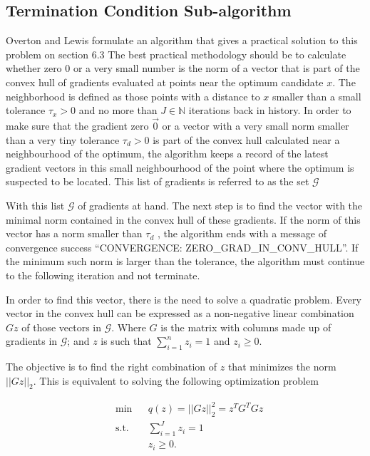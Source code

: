 \subsection{Termination Condition Sub-algorithm}
Overton and Lewis formulate an algorithm that gives a practical solution to this problem on section $6.3$ \citep{overtonlewis}
The best practical methodology should be to calculate whether zero $0$ or a very small number is the norm of a vector that is part of the convex hull of gradients evaluated at points near the optimum candidate $x$. The neighborhood is defined as those points with a distance to $x$ smaller than a small tolerance $\tau_x > 0$ and no more than $J \in \mathbb{N}$ iterations back in history. In order to make sure that the gradient zero $\vec{0}$ or a vector with a very small norm smaller than a very tiny tolerance $\tau_d > 0$ is part of the convex hull calculated near a neighbourhood of the optimum, the algorithm  keeps a record of the latest gradient vectors in this small neighbourhood of the point where the optimum is suspected to be located. This list of gradients is referred to as the set $\mathcal{G}$ \citep{overtonlewis}

With this list $\mathcal{G}$ of gradients at hand. The next step is to find the vector with the minimal norm contained in the convex hull of these gradients.  If the norm of this vector has a norm smaller than $\tau_d$ , the algorithm ends with a message of convergence success ``CONVERGENCE: ZERO\_GRAD\_IN\_CONV\_HULL''. If the minimum such norm is larger than the tolerance, the algorithm must continue to the following iteration and not terminate.

In order to find this vector, there is the need to solve a quadratic problem. Every vector in the convex hull can be expressed as a non-negative linear combination $Gz$ of those vectors in $\mathcal{G}$. Where $G$ is the matrix with columns made up of gradients in $\mathcal{G}$; and $z$ is such that $\sum_{i=1}^n z_i = 1$ and $z_i \geq 0$.

The objective is to find the right combination of $z$ that minimizes the norm $||Gz||_2$.  This is equivalent to solving the following optimization problem

\begin{equation} \label{quadraticproblem}
  \begin{aligned}
    & {\text{min}}
    & & q(z) = ||G z ||_2^2 = z^TG^TGz  \\
    & \text{s.t.}
    & & \sum_{i = 1} ^J z_i = 1 \; \\
    & & & z_i \geq 0.
  \end{aligned}
\end{equation}

